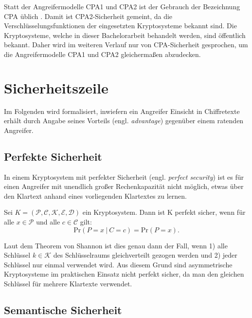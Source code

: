 Statt der Angreifermodelle CPA1 und CPA2 ist der Gebrauch der Bezeichnung CPA üblich  \cite{armknecht2013group}. Damit ist CPA2-Sicherheit gemeint, da die Verschlüsselungsfunktionen der eingesetzten Kryptosysteme bekannt sind. Die Kryptosysteme, welche in dieser Bachelorarbeit behandelt werden, sind öffentlich bekannt. Daher wird im weiteren Verlauf nur von CPA-Sicherheit gesprochen, um die Angreifermodelle CPA1 und CPA2 gleichermaßen abzudecken.

\section{Sicherheitszeile}

Im Folgenden wird formalisiert, inwiefern ein Angreifer Einsicht in Chiffretexte erhält durch Angabe seines Vorteils (engl. \textit{advantage}) gegenüber einem ratenden Angreifer. 

\subsection{Perfekte Sicherheit}

In einem Kryptosystem mit perfekter Sicherheit (engl. \textit{perfect security}) ist es für einen Angreifer mit unendlich großer Rechenkapazität nicht möglich, etwas über den Klartext anhand eines vorliegenden Klartextes zu lernen. 

\begin{theorem}
Sei $K = (\mathcal{P},\mathcal{C},\mathcal{K},\mathcal{E},\mathcal{D})$ ein Kryptosystem. Dann ist K perfekt sicher, wenn für alle $x\in\mathcal{P}$ und alle $c\in\mathcal{C}$ gilt:
\begin{equation*}
\text{Pr}(P=x\ |\ C=c) = \text{Pr}(P=x).
\end{equation*}

\end{theorem}

\cite[p.280]{smart2003}

 Laut dem Theorem von Shannon ist dies genau dann der Fall, wenn 1) alle Schlüssel $k\in\mathcal{K}$ des Schlüsselraums gleichverteilt gezogen werden und 2) jeder Schlüssel nur einmal verwendet wird. \cite[p.36]{katz2014introduction} Aus diesem Grund sind asymmetrische Kryptosysteme im praktischen Einsatz nicht perfekt sicher, da man den gleichen Schlüssel für mehrere Klartexte verwendet.
 
\subsection{Semantische Sicherheit}
\label{semantischSicher}

